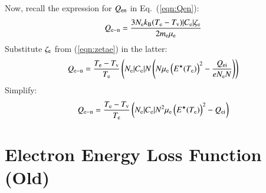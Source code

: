\documentclass{warpdoc}
\begin{document}
Now, recall the expression for $Q_{\rm en}$ in Eq.\ (\ref{eqn:Qen}):
%
\begin{equation}
  Q_{\rm e-n} = \frac{3 N_{\rm e} k_{\rm B} (T_{\rm e}-T_{\rm v})  |C_{\rm e}| \zeta_{\rm e}}{2 m_{\rm e}\mu_{\rm e}}
\end{equation}
%
Substitute $\zeta_{\rm e}$ from (\ref{eqn:zetae}) in the latter:
%
\begin{equation}
  Q_{\rm e-n} =  \frac{T_{\rm e}-T_{\rm v}}{T_{\rm e}} \left( N_{\rm e}   |C_{\rm e}|  N
\left( N \mu_{\rm e}  \left(E^\star(T_{\rm e})\right)^2
 - \frac{Q_{\rm ei}}{e N_{\rm e} N}\right) \right)
\end{equation}
%
Simplify:
%
\begin{equation}
  Q_{\rm e-n} = \frac{T_{\rm e}-T_{\rm v}}{T_{\rm e}} \left( N_{\rm e}   |C_{\rm e}|  N^2
  \mu_{\rm e}  \left(E^\star(T_{\rm e})\right)^2
 - Q_{\rm ei} \right)
\end{equation}
%



\section{Electron Energy Loss Function (Old)}
\end{document}
